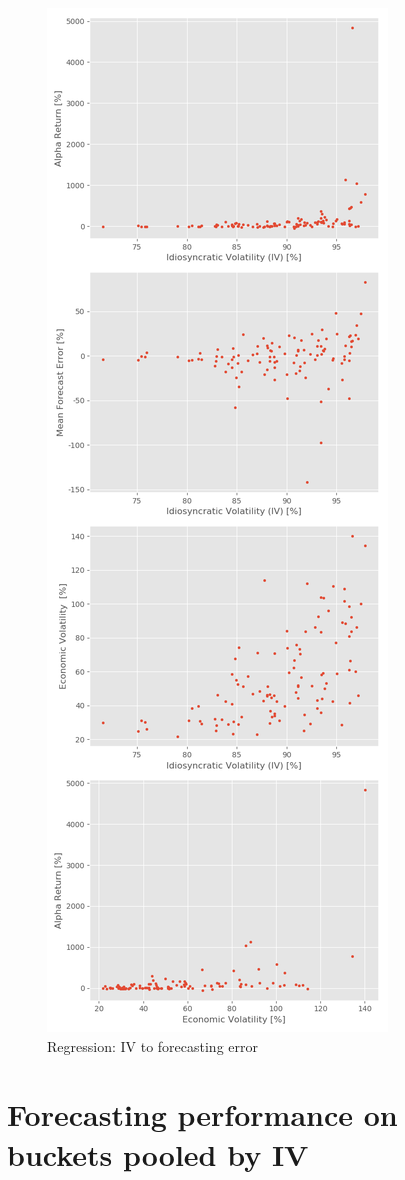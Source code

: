 \begin{figure}[h]
    \centering
    \includegraphics[height = 9 in , width = 5 in]{Plot/IndividualStockRegression.png}
    \caption{Regression: IV to forecasting error}
    \label{visualization}
\end{figure}

\section*{Forecasting performance on buckets pooled by IV}

